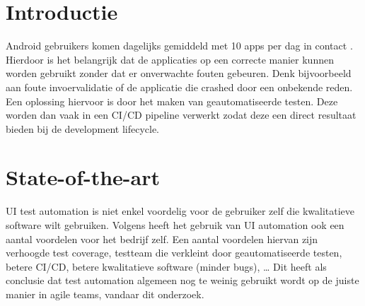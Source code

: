\newcommand{\uiTestAut}{UI test automation}



\section{Introductie}%
\label{sec:introductie}

Android gebruikers komen dagelijks gemiddeld met 10 apps per dag in contact \autocite{PANKO2018}. 
Hierdoor is het belangrijk dat de applicaties op een correcte manier kunnen worden gebruikt zonder 
dat er onverwachte fouten gebeuren. Denk bijvoorbeeld aan foute invoervalidatie of
de applicatie die crashed door een onbekende reden.  %
Een oplossing hiervoor is door het maken van geautomatiseerde testen. Deze worden dan vaak in een CI/CD pipeline verwerkt zodat deze een 
direct resultaat bieden bij de development lifecycle.




\section{State-of-the-art}%
\label{sec:state-of-the-art}

UI test automation is niet enkel voordelig voor de gebruiker zelf die kwalitatieve software wilt gebruiken.
Volgens \textcite{Microfocus} heeft het gebruik van UI automation ook een aantal voordelen voor het bedrijf zelf.
Een aantal voordelen hiervan zijn verhoogde test coverage, testteam die verkleint door geautomatiseerde testen, 
betere CI/CD, betere kwalitatieve software (minder bugs), \dots{}
Dit heeft als conclusie dat test automation algemeen nog te weinig gebruikt wordt op de juiste manier in agile teams, vandaar dit onderzoek.


